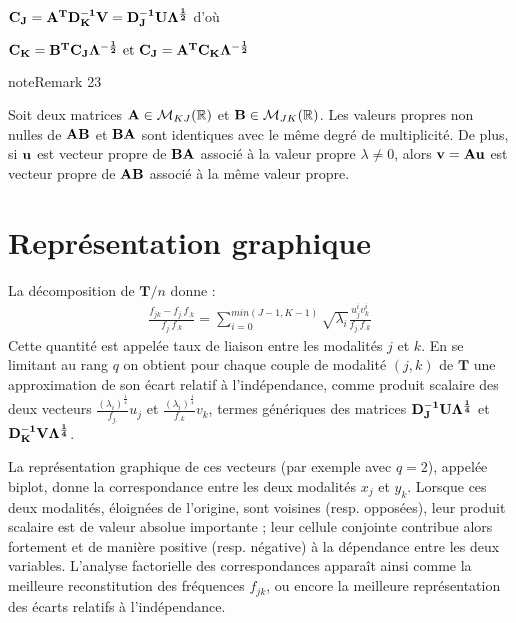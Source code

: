 \documentclass[letterpaper,10pt,french]{sphinxmanual}
\begin{document}
\sphinxAtStartPar
\({\bf C_J}={\bf A^TD_K^{-1}V}= {\bf D_J^{-1}U \Lambda^{\frac{1}{2}}}\)
d’où

\sphinxAtStartPar
\({\bf C_K}={\bf B^TC_J\Lambda^{-\frac{1}{2}}} \textrm{    et    } {\bf C_J}={\bf A^TC_K\Lambda^{-\frac{1}{2}}}\)
\label{afc:remark-0}
\begin{sphinxadmonition}{note}{Remark 23}



\sphinxAtStartPar
Soit deux matrices \({\bf A}\in\mathcal{M}_{KJ}(\mathbb{R)}\)  et \({\bf B}\in\mathcal{M}_{JK}(\mathbb{R})\). Les valeurs propres non nulles de \({\bf AB}\) et \({\bf BA}\) sont identiques avec le même degré de multiplicité. De plus, si \(\bf u\) est vecteur propre de \({\bf BA}\) associé à la valeur propre \(\lambda\neq 0\), alors \({\bf v} = {\bf Au} \) est vecteur propre de \({\bf AB}\) associé à la même valeur
propre.
\end{sphinxadmonition}


\section{Représentation graphique}
\label{\detokenize{afc:representation-graphique}}
\sphinxAtStartPar
La décomposition de \(\mathbf T/n\) donne :
\begin{equation*}
\begin{split}\frac{f_{jk}-f_{j.}f_{.k}}{f_{j.}f_{.k}} = \displaystyle\sum_{i=0}^{min(J-1,K-1)}\sqrt{\lambda_i}\frac{u^i_jv^i_k}{f_{j.}f_{.k}}\end{split}
\end{equation*}
\sphinxAtStartPar
Cette quantité est appelée taux de liaison entre les modalités \(j\) et \(k\). En se limitant au rang \(q\) on obtient pour chaque couple de modalité \((j,k)\) de \(\mathbf T\) une approximation de son écart relatif à l’indépendance, comme produit scalaire des deux vecteurs \(\frac{(\lambda_i)^{\frac{1}{4}}}{f_{j.}}u_j\) et \(\frac{(\lambda_i)^{\frac{1}{4}}}{f_{.k}}v_k\), termes génériques des matrices \({\bf D_J^{-1}U\Lambda^{\frac{1}{4}}}\) et \({\bf D_K^{-1}V\Lambda^{\frac{1}{4}}}\).

\sphinxAtStartPar
La représentation graphique de ces vecteurs (par exemple avec \(q=2\)), appelée biplot, donne la correspondance entre les deux modalités \(x_j\) et \(y_k\). Lorsque ces deux modalités, éloignées de l’origine, sont
voisines (resp. opposées), leur produit scalaire est de valeur absolue importante ; leur cellule conjointe contribue alors fortement et de manière positive
(resp. négative) à la dépendance entre les deux variables. L’analyse factorielle des correspondances apparaît ainsi comme la meilleure reconstitution des fréquences \(f_{jk}\), ou encore la meilleure représentation des écarts relatifs à l’indépendance.
\end{document}
